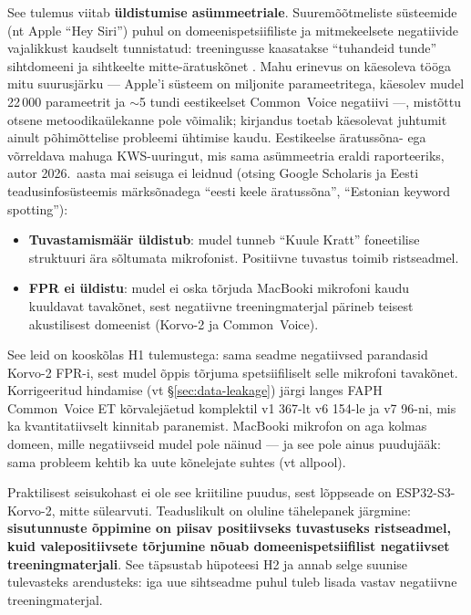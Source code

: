 See tulemus viitab \textbf{üldistumise asümmeetriale}. Suuremõõtmeliste süsteemide (nt Apple \enquote{Hey Siri}) puhul on domeeni\-spetsiifiliste ja mitmekeelsete negatiivide vajalikkust kaudselt tunnistatud: treeningusse kaasatakse \enquote{tuhandeid tunde} sihtdomeeni ja sihtkeelte mitte-äratus\-kõnet \cite{apple-heysiri2017}. Mahu erinevus on käesoleva tööga mitu suurusjärku --- Apple'i süsteem on miljonite parameetritega, käesolev mudel 22\,000 parameetrit ja $\sim$5 tundi eestikeelset Common~Voice negatiivi ---, mistõttu otsene metoodikaülekanne pole võimalik; kirjandus toetab käesolevat juhtumit ainult põhimõttelise probleemi ühtimise kaudu. Eestikeelse äratussõna- ega võrreldava mahuga KWS-uuringut, mis sama asümmeetria eraldi raporteeriks, autor 2026.~aasta mai seisuga ei leidnud (otsing Google Scholaris ja Eesti teadusinfosüsteemis märksõnadega \enquote{eesti keele äratussõna}, \enquote{Estonian keyword spotting}):
\begin{itemize}
    \item \textbf{Tuvastamismäär üldistub}: mudel tunneb \enquote{Kuule Kratt} foneetilise struktuuri ära sõltumata mikrofonist. Positiivne tuvastus toimib ristseadmel.
    \item \textbf{FPR ei üldistu}: mudel ei oska tõrjuda MacBooki mikrofoni kaudu kuuldavat tavakõnet, sest negatiivne treeningmaterjal pärineb teisest akustilisest domeenist (Korvo-2 ja Common~Voice).
\end{itemize}

See leid on kooskõlas H1 tulemustega: sama seadme negatiivsed parandasid Korvo-2 FPR-i, sest mudel õppis tõrjuma spetsiifiliselt selle mikrofoni tavakõnet. Korrigeeritud hindamise (vt §\ref{sec:data-leakage}) järgi langes FAPH Common~Voice ET kõrvalejäetud komplektil v1 367-lt v6 154-le ja v7 96-ni, mis ka kvantitatiivselt kinnitab paranemist. MacBooki mikrofon on aga kolmas domeen, mille negatiivseid mudel pole näinud --- ja see pole ainus puudujääk: sama probleem kehtib ka uute kõnelejate suhtes (vt allpool).

Praktilisest seisukohast ei ole see kriitiline puudus, sest lõppseade on ESP32-S3-Korvo-2, mitte sülearvuti. Teaduslikult on oluline tähelepanek järgmine: \textbf{sisutunnuste õppimine on piisav positiivseks tuvastuseks ristseadmel, kuid valepositiivsete tõrjumine nõuab domeenispetsiifilist negatiivset treeningmaterjali}. See täpsustab hüpoteesi H2 ja annab selge suunise tulevasteks arendusteks: iga uue sihtseadme puhul tuleb lisada vastav negatiivne treeningmaterjal.

